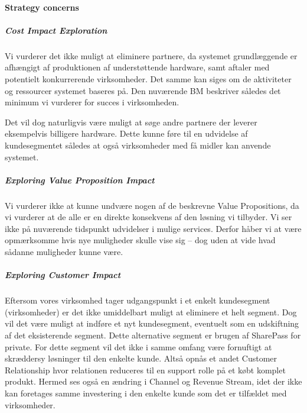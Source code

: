 \paragraph{Strategy concerns}

\subparagraph{Cost Impact Exploration}
Vi vurderer det ikke muligt at eliminere partnere, da systemet grundlæggende er afhængigt af produktionen af understøttende hardware, samt aftaler med potentielt konkurrerende virksomheder.
Det samme kan siges om de aktiviteter og ressourcer systemet baseres på.
Den nuværende BM beskriver således det minimum vi vurderer for succes i virksomheden.

Det vil dog naturligvis være muligt at søge andre partnere der leverer eksempelvis billigere hardware.
Dette kunne føre til en udvidelse af kundesegmentet således at også virksomheder med få midler kan anvende systemet.


\subparagraph{Exploring Value Proposition Impact}
Vi vurderer ikke at kunne undvære nogen af de beskrevne Value Propositions, da vi vurderer at de alle er en direkte konsekvens af den løsning vi tilbyder.
Vi ser ikke på nuværende tidspunkt udvidelser i mulige services.
Derfor håber vi at være opmærksomme hvis nye muligheder skulle vise sig -- dog uden at vide hvad sådanne muligheder kunne være.


\subparagraph{Exploring Customer Impact}
Eftersom vores virksomhed tager udgangspunkt i et enkelt kundesegment (virksomheder) er det ikke umiddelbart muligt at eliminere et helt segment.
Dog vil det være muligt at indføre et nyt kundesegment, eventuelt som en udskiftning af det eksisterende segment.
Dette alternative segment er brugen af SharePass for private.
For dette segment vil det ikke i samme omfang være fornuftigt at skræddersy løsninger til den enkelte kunde.
Altså opnås et andet Customer Relationship hvor relationen reduceres til en support rolle på et købt komplet produkt.
Hermed ses også en ændring i Channel og Revenue Stream, idet der ikke kan foretages samme investering i den enkelte kunde som det er tilfældet med virksomheder.

